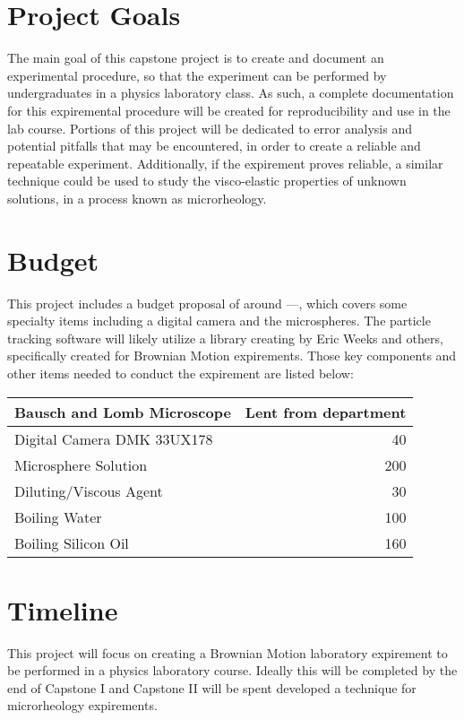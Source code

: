 \documentclass[aps,prb,twocolumn,groupedaddress,nofootinbib,floatfix]{revtex4}
\begin{document}
\section*{Project Goals}	
The main goal of this capstone project is to create and document an experimental procedure, so that the experiment can be performed by undergraduates in a physics laboratory class. As such, a complete documentation for this expiremental procedure will be created for reproducibility and use in the lab course. Portions of this project will be dedicated to error analysis and potential pitfalls that may be encountered, in order to create a reliable and repeatable experiment. Additionally, if the expirement proves reliable, a similar technique could be used to study the visco-elastic properties of unknown solutions, in a process known as microrheology. 

\section*{Budget}
This project includes a budget proposal of around ---, which covers some specialty items including a digital camera and the microspheres. The particle tracking software will likely utilize a library creating by Eric Weeks and others, specifically created for Brownian Motion expirements.
Those key components and other items needed to conduct the expirement are listed below:


 \begin{tabular}{|l|r|}
\hline
  Bausch and Lomb Microscope & Lent from department\\ \hline

  Digital Camera DMK 33UX178 & 40 \\ \hline
  
  Microsphere Solution & 200  \\ \hline
 
  Diluting/Viscous Agent & 30  \\ \hline
  \hline
   Boiling Water & 100 \\ \hline
  \hline
   Boiling Silicon Oil & 160 \\ \hline
  \hline
\end{tabular}

  


\section*{Timeline}
This project will focus on creating a Brownian Motion laboratory expirement to be performed in a physics laboratory course. Ideally this will be completed by the end of Capstone I and Capstone II will be spent developed a technique for microrheology expirements. 
\end{document}
